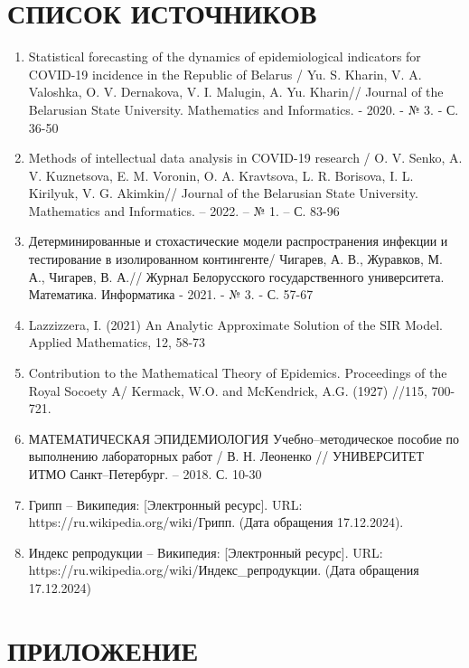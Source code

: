 \documentclass[a4paper, 14pt]{extreport}
\begin{document}
	\chapter*{СПИСОК ИСТОЧНИКОВ}
	\begin{enumerate}
		\item Statistical forecasting of the dynamics of epidemiological indicators for COVID-19 incidence in the Republic of Belarus / Yu. S. Kharin, V. A. Valoshka, O. V. Dernakova, V. I. Malugin, A. Yu. Kharin// Journal of the Belarusian State University. Mathematics and Informatics. - 2020. - № 3. - С. 36-50
		\item Methods of intellectual data analysis in COVID-19 research / O. V. Senko, A. V. Kuznetsova, E. M. Voronin, O. A. Kravtsova, L. R. Borisova, I. L. Kirilyuk, V. G. Akimkin// Journal of the Belarusian State University. Mathematics and Informatics. – 2022. – № 1. – С. 83-96
		\item Детерминированные и стохастические модели распространения инфекции и тестирование в изолированном контингенте/ Чигарев, А. В., Журавков, М. А., Чигарев, В. А.// Журнал Белорусского государственного университета. Математика. Информатика - 2021. - № 3. - С. 57-67
		\item Lazzizzera, I. (2021) An Analytic Approximate Solution of the SIR Model. Applied Mathematics, 12, 58-73
		\item Contribution to the Mathematical Theory of Epidemics. Proceedings of the Royal Socoety A/ Kermack, W.O. and McKendrick, A.G. (1927) //115, 700-721.
		\item МАТЕМАТИЧЕСКАЯ ЭПИДЕМИОЛОГИЯ Учебно–методическое пособие
		по выполнению лабораторных работ / В. Н. Леоненко // УНИВЕРСИТЕТ ИТМО Санкт–Петербург. -- 2018. С. 10-30
		\item Грипп -- Википедия: [Электронный ресурс]. URL:\\ https://ru.wikipedia.org/wiki/Грипп. (Дата обращения 17.12.2024).
		\item Индекс репродукции -- Википедия: [Электронный ресурс]. URL:\\
		https://ru.wikipedia.org/wiki/Индекс\_репродукции. 
		(Дата обращения\\ 17.12.2024)
	\end{enumerate}
	\newpage
	\chapter*{ПРИЛОЖЕНИЕ}
\end{document}
